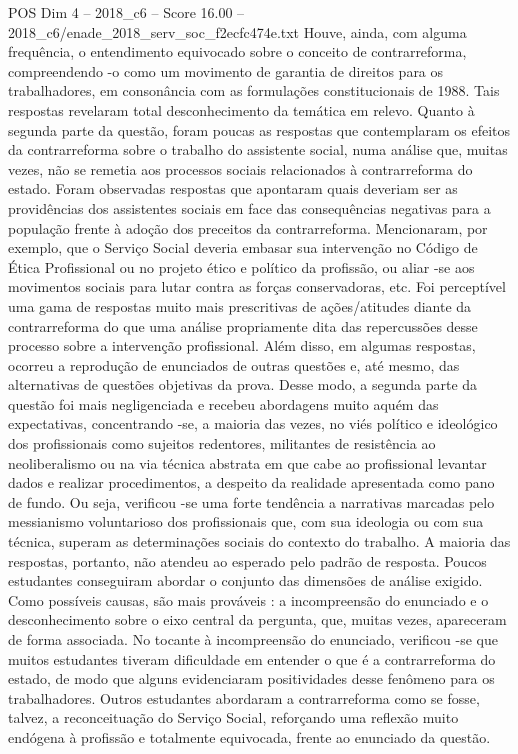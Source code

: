 \begin{textsample}{POS Dim 4 – 2018\_c6 – Score 16.00 – 2018\_c6/enade\_2018\_serv\_soc\_f2ecfc474e.txt}
Houve, ainda, com alguma frequência, o entendimento equivocado sobre o conceito de contrarreforma, compreendendo -o como um movimento de garantia de direitos para os trabalhadores, em consonância com as formulações constitucionais de 1988.
Tais respostas revelaram total desconhecimento da temática em relevo.
Quanto à segunda parte da questão, foram poucas as respostas que contemplaram os efeitos da contrarreforma sobre o trabalho do assistente social, numa análise que, muitas vezes, não se remetia aos processos sociais relacionados à contrarreforma do estado.
Foram observadas respostas que apontaram quais deveriam ser as providências dos assistentes sociais em face das consequências negativas para a população frente à adoção dos preceitos da contrarreforma.
Mencionaram, por exemplo, que o Serviço Social deveria embasar sua intervenção no Código de Ética Profissional ou no projeto ético e político da profissão, ou aliar -se aos movimentos sociais para lutar contra as forças conservadoras, etc.
Foi perceptível uma gama de respostas muito mais prescritivas de ações/atitudes diante da contrarreforma do que uma análise propriamente dita das repercussões desse processo sobre a intervenção profissional.
Além disso, em algumas respostas, ocorreu a reprodução de enunciados de outras questões e, até mesmo, das alternativas de questões objetivas da prova.
Desse modo, a segunda parte da questão foi mais negligenciada e recebeu abordagens muito aquém das expectativas, concentrando -se, a maioria das vezes, no viés político e ideológico dos profissionais como sujeitos redentores, militantes de resistência ao neoliberalismo ou na via técnica abstrata em que cabe ao profissional levantar dados e realizar procedimentos, a despeito da realidade apresentada como pano de fundo.
Ou seja, verificou -se uma forte tendência a narrativas marcadas pelo messianismo voluntarioso dos profissionais que, com sua ideologia ou com sua técnica, superam as determinações sociais do contexto do trabalho.
A maioria das respostas, portanto, não atendeu ao esperado pelo padrão de resposta.
Poucos estudantes conseguiram abordar o conjunto das dimensões de análise exigido.
Como possíveis causas, são mais prováveis : a incompreensão do enunciado e o desconhecimento sobre o eixo central da pergunta, que, muitas vezes, apareceram de forma associada.
No tocante à incompreensão do enunciado, verificou -se que muitos estudantes tiveram dificuldade em entender o que é a contrarreforma do estado, de modo que alguns evidenciaram positividades desse fenômeno para os trabalhadores.
Outros estudantes abordaram a contrarreforma como se fosse, talvez, a reconceituação do Serviço Social, reforçando uma reflexão muito endógena à profissão e totalmente equivocada, frente ao enunciado da questão.

\end{textsample}
